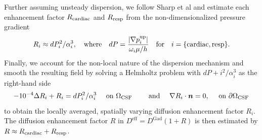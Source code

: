 Further assuming unsteady dispersion, we follow Sharp et al \cite{keith2019dispersion} and estimate each enhancement factor $R_{\rm cardiac}$ and $R_{\rm resp}$ from the non-dimensionalized pressure gradient 
$$R_{i} \approx dP_{i}^2 / \alpha_{i}^3, \quad  \text{where} \quad  dP=\frac{|\nabla p^{\rm up}_{i}|}{\omega_{i} \mu / h} \quad \text{for} \quad i = \{\mathrm{cardiac}, \mathrm{resp}\}.$$
Finally, we account for the non-local nature of the dispersion mechanism and smooth the resulting field by solving a Helmholtz problem with $dP+i^2/\alpha_i^3$ as the right-hand side
\begin{equation}
- 10^{-4} \Delta R_i + R_i = dP_i^2/\alpha_i^3 \quad \text{ on } \Omega_{\rm CSF} \qquad \text{ and } \quad \nabla R_i \cdot \bm n = 0, \quad \text{ on } \partial \Omega_{\rm CSF}
\end{equation}
to obtain the locally averaged, spatially varying diffusion enhancement factor $R_i$. The diffusion enhancement factor $R$ in $D^{\mathrm{eff}} = D^{\mathrm{Gad}}( 1 +R)$ is then estimated by $R \approx R_{\rm{cardiac}} + R_{\rm{resp}}$. 





